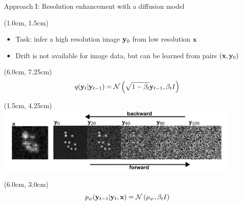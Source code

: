 \documentclass{beamer}					%
\begin{document}

\begin{frame}{Approach I: Resolution enhancement with a diffusion model}

\begin{textblock*}{13cm}(1.0cm, 1.5cm)

\begin{itemize}
\item Task: infer a high resolution image $\bold{y}_0$ from low resolution $\bold{x}$
\item Drift is not available for image data, but can be learned from pairs $(\bold{x},\bold{y}_{0})$
\end{itemize}
\end{textblock*}

\begin{textblock*}{2cm}(6.0cm, 7.25cm)
\begin{equation*}
q(\bold{y}_{t}|\bold{y}_{t-1}) = \mathcal{N}\left(\sqrt{1-\beta_{t}}\bold{y}_{t-1},\beta_t I\right)
\end{equation*}
\end{textblock*}

\begin{textblock*}{12cm}(1.5cm, 4.25cm)
\includegraphics[width=12cm]{../../phd/ddpm/ddpm/media/ForwardBackward.png}
\end{textblock*}

\begin{textblock*}{2cm}(6.0cm, 3.0cm)
\begin{equation*}
p_{\psi}(\bold{y}_{t-1}|\bold{y}_{t},\bold{x}) = \mathcal{N}\left(\mu_{\psi},\beta_{t}I\right)
\end{equation*}

\end{textblock*}

\end{frame}
\end{document}

